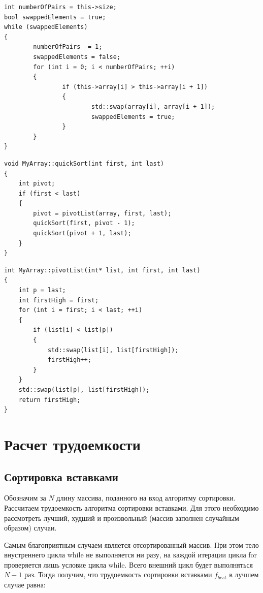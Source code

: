 \documentclass[a4paper,14pt]{report}
\begin{document}
\begin{lstlisting}[label=some-code,caption=Алгоритм пузырьковой сортировки с флагом]
int numberOfPairs = this->size;
bool swappedElements = true;
while (swappedElements)
{
		numberOfPairs -= 1;
		swappedElements = false;
		for (int i = 0; i < numberOfPairs; ++i)
		{
				if (this->array[i] > this->array[i + 1])
				{
						std::swap(array[i], array[i + 1]);
						swappedElements = true;
				}
		}
}
\end{lstlisting}

\begin{lstlisting}[label=some-code,caption=Алгоритм быстрой сортировки]
void MyArray::quickSort(int first, int last)
{
    int pivot;
    if (first < last)
    {
        pivot = pivotList(array, first, last);
        quickSort(first, pivot - 1);
        quickSort(pivot + 1, last);
    }
}
\end{lstlisting}

\begin{lstlisting}[label=some-code,caption=Подпрограмма разбиения массива]
int MyArray::pivotList(int* list, int first, int last)
{
    int p = last;
    int firstHigh = first;
    for (int i = first; i < last; ++i)
    {
        if (list[i] < list[p])
        {
            std::swap(list[i], list[firstHigh]);
            firstHigh++;
        }
    }
    std::swap(list[p], list[firstHigh]);
    return firstHigh;
}
\end{lstlisting}

\section*{Расчет трудоемкости}

\subsection*{Сортировка вставками}

Обозначим за $N$ длину массива, поданного на вход алгоритму сортировки.
Рассчитаем трудоемкость алгоритма сортировки вставками. Для этого необходимо рассмотреть лучший, худший и произвольный (массив заполнен случайным образом) случаи.

Самым благоприятным случаем является отсортированный массив. При этом тело внустреннего цикла while не выполняется ни разу, на каждой итерации цикла for проверяется лишь условие цикла while.
Всего внешний цикл будет выполняться $N-1$ раз. Тогда получим, что трудоемкость сортировки вставками $f_{best}$ в лучшем случае равна:
\end{document}
